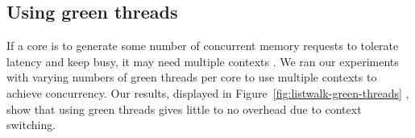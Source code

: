 \subsection{Using green threads}
	If a core is to generate some number of concurrent memory requests to tolerate latency and keep busy, it may need multiple contexts .  We ran our experiments with varying numbers of green threads per core to use multiple contexts to achieve concurrency. Our results, displayed in Figure~\ref{fig:listwalk-green-threads} , show that using green threads gives little to no overhead due to context switching. 


